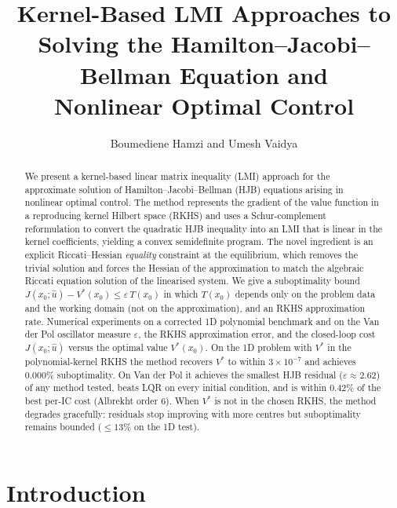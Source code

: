 \documentclass[11pt]{article}
\title{Kernel-Based LMI Approaches to \\ Solving the Hamilton–Jacobi–Bellman Equation and \\ Nonlinear Optimal Control}
\author{Boumediene Hamzi and Umesh Vaidya}
\date{}
\begin{document}
\maketitle

\begin{abstract}
We present a kernel-based linear matrix inequality (LMI) approach for the approximate solution of Hamilton--Jacobi--Bellman (HJB) equations arising in nonlinear optimal control. The method represents the gradient of the value function in a reproducing kernel Hilbert space (RKHS) and uses a Schur-complement reformulation to convert the quadratic HJB inequality into an LMI that is linear in the kernel coefficients, yielding a convex semidefinite program. The novel ingredient is an explicit Riccati--Hessian \emph{equality} constraint at the equilibrium, which removes the trivial solution and forces the Hessian of the approximation to match the algebraic Riccati equation solution of the linearised system. We give a suboptimality bound $J(x_0;\hat u) - V^*(x_0)\le \varepsilon\,T(x_0)$ in which $T(x_0)$ depends only on the problem data and the working domain (not on the approximation), and an RKHS approximation rate. Numerical experiments on a corrected 1D polynomial benchmark and on the Van der Pol oscillator measure $\varepsilon$, the RKHS approximation error, and the closed-loop cost $J(x_0;\hat u)$ versus the optimal value $V^*(x_0)$. On the 1D problem with $V^*$ in the polynomial-kernel RKHS the method recovers $V^*$ to within $3\times10^{-7}$ and achieves $0.000\%$ suboptimality. On Van der Pol it achieves the smallest HJB residual ($\varepsilon\approx 2.62$) of any method tested, beats LQR on every initial condition, and is within $0.42\%$ of the best per-IC cost (Albrekht order 6). When $V^*$ is not in the chosen RKHS, the method degrades gracefully: residuals stop improving with more centres but suboptimality remains bounded ($\le 13\%$ on the 1D test).  
\end{abstract}

\section{Introduction}
\end{document}
